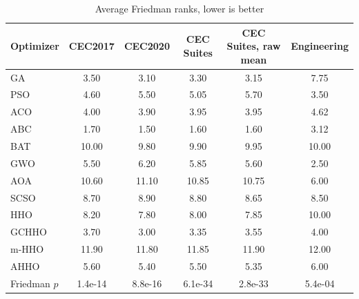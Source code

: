\begin{table}[htbp]
\caption{Average Friedman ranks, lower is better}\label{tab:ranks}
\centering
\begin{tabular}{lccccc}
\toprule
Optimizer & CEC2017 & CEC2020 & CEC Suites & CEC Suites, raw mean & Engineering \\
\midrule
GA & 3.50 & 3.10 & 3.30 & 3.15 & 7.75 \\
PSO & 4.60 & 5.50 & 5.05 & 5.70 & 3.50 \\
ACO & 4.00 & 3.90 & 3.95 & 3.95 & 4.62 \\
ABC & 1.70 & 1.50 & 1.60 & 1.60 & 3.12 \\
BAT & 10.00 & 9.80 & 9.90 & 9.95 & 10.00 \\
GWO & 5.50 & 6.20 & 5.85 & 5.60 & 2.50 \\
AOA & 10.60 & 11.10 & 10.85 & 10.75 & 6.00 \\
SCSO & 8.70 & 8.90 & 8.80 & 8.65 & 8.50 \\
HHO & 8.20 & 7.80 & 8.00 & 7.85 & 10.00 \\
GCHHO & 3.70 & 3.00 & 3.35 & 3.55 & 4.00 \\
m-HHO & 11.90 & 11.80 & 11.85 & 11.90 & 12.00 \\
AHHO & 5.60 & 5.40 & 5.50 & 5.35 & 6.00 \\
\midrule
Friedman $p$ & 1.4e-14 & 8.8e-16 & 6.1e-34 & 2.8e-33 & 5.4e-04 \\
\bottomrule
\end{tabular}
\end{table}
